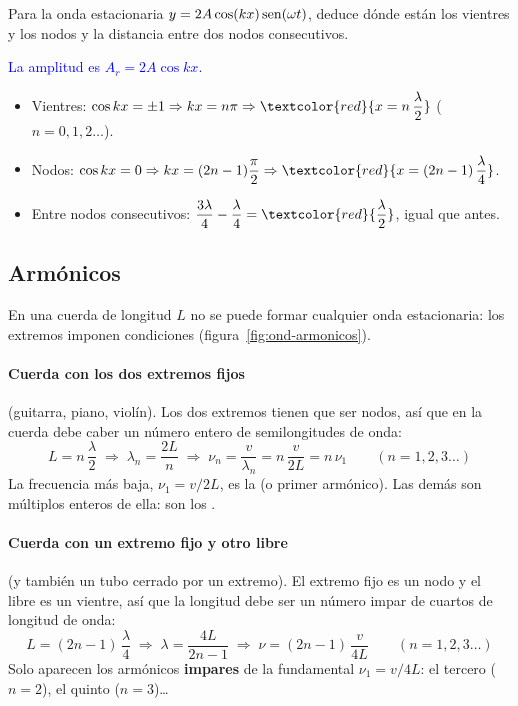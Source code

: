 \begin{exercise}
    Para la onda estacionaria \(y = 2A\cos(kx)\operatorname{sen}(\omega t)\), deduce dónde están los vientres y los nodos y la distancia
    entre dos nodos consecutivos.
    \begin{solu}
        \textcolor{blue}{La amplitud es \(A_r = 2A\cos kx\).}
        \begin{itemize}
            \item Vientres: \(\cos kx = \pm 1 \Rightarrow kx = n\pi \Rightarrow \textcolor{red}{x = n\,\dfrac{\lambda}{2}}\) (\(n = 0, 1, 2\ldots\)).
            \item Nodos: \(\cos kx = 0 \Rightarrow kx = (2n - 1)\dfrac{\pi}{2} \Rightarrow \textcolor{red}{x = (2n - 1)\,\dfrac{\lambda}{4}}\).
            \item Entre nodos consecutivos: \(\dfrac{3\lambda}{4} - \dfrac{\lambda}{4} = \textcolor{red}{\dfrac{\lambda}{2}}\), igual que antes.
        \end{itemize}
    \end{solu}
\end{exercise}

\subsection{Armónicos}\label{subsec:ond-armonicos}

En una cuerda de longitud \(L\) no se puede formar cualquier onda estacionaria: los extremos imponen condiciones
(figura~\ref{fig:ond-armonicos}).

\paragraph{Cuerda con los dos extremos fijos} (guitarra, piano, violín). Los dos extremos tienen que ser nodos, así que en
la cuerda debe caber un número entero de semilongitudes de onda:
\begin{equation*}
    L = n\,\dfrac{\lambda}{2} \;\Rightarrow\; \lambda_n = \dfrac{2L}{n} \;\Rightarrow\; \boxed{\nu_n = \dfrac{v}{\lambda_n} = n\,\dfrac{v}{2L} = n\,\nu_1} \qquad (n = 1, 2, 3\ldots)
\end{equation*}
La frecuencia más baja, \(\nu_1 = v/2L\), es la  (o primer armónico). Las demás son múltiplos
enteros de ella: son los .

\paragraph{Cuerda con un extremo fijo y otro libre} (y también un tubo cerrado por un extremo). El extremo fijo es un nodo y
el libre es un vientre, así que la longitud debe ser un número impar de cuartos de longitud de onda:
\begin{equation*}
    L = (2n - 1)\,\dfrac{\lambda}{4} \;\Rightarrow\; \lambda = \dfrac{4L}{2n - 1} \;\Rightarrow\; \boxed{\nu = (2n - 1)\,\dfrac{v}{4L}} \qquad (n = 1, 2, 3\ldots)
\end{equation*}
Solo aparecen los armónicos \textbf{impares} de la fundamental \(\nu_1 = v/4L\): el tercero (\(n = 2\)), el quinto (\(n = 3\))\ldots

